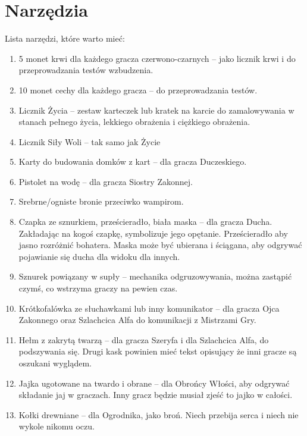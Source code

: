 \section{Narzędzia}
	Lista narzędzi, które warto mieć:
	\begin{enumerate}
		\item 5 monet krwi dla każdego gracza czerwono-czarnych -- jako licznik krwi i do przeprowadzania testów wzbudzenia.
		\item 10 monet cechy dla każdego gracza -- do przeprowadzania testów.
		\item Licznik Życia -- zestaw karteczek lub kratek na karcie do zamalowywania w stanach pełnego życia, lekkiego obrażenia i ciężkiego obrażenia.
		\item Licznik Siły Woli -- tak samo jak Życie
		\item Karty do budowania domków z kart -- dla gracza Duczeskiego.
		\item Pistolet na wodę -- dla gracza Siostry Zakonnej.
		\item Srebrne/ogniste bronie przeciwko wampirom.
		\item Czapka ze sznurkiem, prześcieradło, biała maska -- dla gracza Ducha. Zakładając na kogoś czapkę, symbolizuje jego opętanie.
			Prześcieradło aby jasno rozróżnić bohatera. Maska może być ubierana i ściągana, aby odgrywać pojawianie się ducha dla widoku dla innych.
		\item Sznurek powiązany w supły -- mechanika odgruzowywania, można zastąpić czymś, co wstrzyma graczy na pewien czas.
		\item Krótkofalówka ze słuchawkami lub inny komunikator -- dla gracza Ojca Zakonnego oraz Szlachcica Alfa do komunikacji z Mistrzami Gry.
		\item Hełm z zakrytą twarzą -- dla gracza Szeryfa i dla Szlachcica Alfa, do podszywania się.
			Drugi kask powinien mieć tekst opisujący że inni gracze są oszukani wyglądem.
		\item Jajka ugotowane na twardo i obrane -- dla Obrońcy Włości, aby odgrywać składanie jaj w graczach. Inny gracz będzie musiał zjeść to jajko w całości.
		\item Kołki drewniane -- dla Ogrodnika, jako broń. Niech przebija serca i niech nie wykole nikomu oczu.
	\end{enumerate}
	
